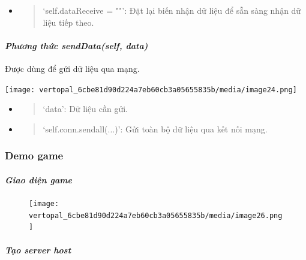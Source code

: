 \documentclass[a4paper]{article}
\begin{document}
\begin{itemize}
\item
  \begin{quote}
  `self.dataReceive = ""': Đặt lại biến nhận dữ liệu để sẵn sàng nhận dữ
  liệu tiếp theo.
  \end{quote}
\end{itemize}

\hypertarget{phux1b0ux1a1ng-thux1ee9c-senddataself-data}{%
\paragraph{\texorpdfstring{\emph{ Phương thức sendData(self,
data)}}{Phương thức sendData(self, data)}}\label{phux1b0ux1a1ng-thux1ee9c-senddataself-data}}

Được dùng để gửi dữ liệu qua mạng.

\texttt{[image: vertopal\_6cbe81d90d224a7eb60cb3a05655835b/media/image24.png]}

\begin{itemize}
\item
  \begin{quote}
  `data': Dữ liệu cần gửi.
  \end{quote}
\item
  \begin{quote}
  `self.conn.sendall(...)': Gửi toàn bộ dữ liệu qua kết nối mạng.
  \end{quote}
\end{itemize}

\hypertarget{demo-game}{%
\subsubsection{Demo game}\label{demo-game}}

\hypertarget{giao-diux1ec7n-game}{%
\paragraph{\texorpdfstring{\emph{Giao diện
game}}{Giao diện game}}\label{giao-diux1ec7n-game}}
\begin{figure}
    \centering
\texttt{[image: vertopal\_6cbe81d90d224a7eb60cb3a05655835b/media/image26.png]}

\end{figure}


\hypertarget{tux1ea1o-server-host}{%
\paragraph{\texorpdfstring{\emph{Tạo server
host}}{Tạo server host}}\label{tux1ea1o-server-host}}
\end{document}
